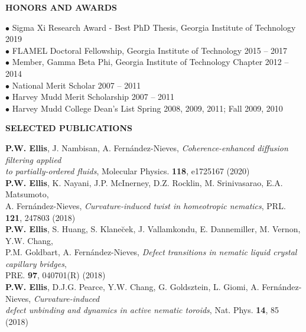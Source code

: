 \documentclass[10pt]{article}
\newenvironment{changemargin}[2]{%
  \list{}{\rightmargin#2\leftmargin#1
    \parsep=0pt\topsep=1pt\partopsep=0pt}
\item[]} {\endlist}
\newenvironment{indentmore}{\begin{changemargin}{10pt}{0cm}}{\end{changemargin}}
\begin{document}
\textbf{\large HONORS AND AWARDS}
\begin{indentmore}
\begin{indentmore}
$\bullet$ Sigma Xi Research Award - Best PhD Thesis, Georgia Institute of Technology \hfill 2019\\
$\bullet$ FLAMEL Doctoral Fellowship, Georgia Institute of Technology \hfill 2015 -- 2017\\
$\bullet$ Member, Gamma Beta Phi, Georgia Institute of Technology Chapter \hfill 2012 -- 2014\\
$\bullet$ National Merit Scholar \hfill 2007 -- 2011\\
$\bullet$ Harvey Mudd Merit Scholarship \hfill 2007 -- 2011\\
$\bullet$ Harvey Mudd College Dean's List \hfill Spring 2008, 2009, 2011; Fall 2009, 2010\\
\end{indentmore}
\end{indentmore}

\newpage

\textbf{\large SELECTED PUBLICATIONS}
\begin{indentmore}
\textbf{P.W. Ellis}, J. Nambisan, A. Fern\'{a}ndez-Nieves, \emph{Coherence-enhanced diffusion filtering applied \\ \hspace*{15pt} to partially-ordered fluids}, Molecular Physics. {\bf 118}, e1725167 (2020)\\

\textbf{P.W. Ellis}, K. Nayani, J.P. McInerney, D.Z. Rocklin, M. Srinivasarao, E.A. Matsumoto, \\ \hspace*{15pt} A. Fern\'{a}ndez-Nieves, \emph{Curvature-induced twist in homeotropic nematics}, PRL. {\bf 121}, 247803 (2018) \\

\textbf{P.W. Ellis}, S. Huang, S. Klane\u{c}ek, J. Vallamkondu, E. Dannemiller, M. Vernon, Y.W. Chang, \\ \hspace*{15pt} P.M. Goldbart, A. Fern\'{a}ndez-Nieves, \emph{Defect transitions in nematic liquid crystal capillary bridges},\\ \hspace*{15pt} PRE. {\bf 97}, 040701(R) (2018)\\

\textbf{P.W. Ellis}, D.J.G. Pearce, Y.W. Chang, G. Goldsztein, L. Giomi, A. Fern\'{a}ndez-Nieves, \emph{Curvature-induced \\ \hspace*{15pt} defect unbinding and dynamics in active nematic toroids}, Nat. Phys. {\bf 14}, 85 (2018)\\
\end{indentmore}
\end{document}
